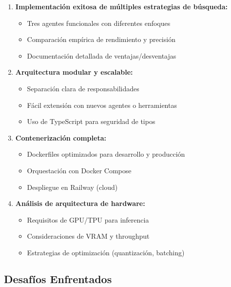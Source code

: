 \documentclass[12pt,a4paper]{article}
\begin{document}
\begin{enumerate}
    \item \textbf{Implementación exitosa de múltiples estrategias de búsqueda:}
    \begin{itemize}
        \item Tres agentes funcionales con diferentes enfoques
        \item Comparación empírica de rendimiento y precisión
        \item Documentación detallada de ventajas/desventajas
    \end{itemize}

    \item \textbf{Arquitectura modular y escalable:}
    \begin{itemize}
        \item Separación clara de responsabilidades
        \item Fácil extensión con nuevos agentes o herramientas
        \item Uso de TypeScript para seguridad de tipos
    \end{itemize}

    \item \textbf{Contenerización completa:}
    \begin{itemize}
        \item Dockerfiles optimizados para desarrollo y producción
        \item Orquestación con Docker Compose
        \item Despliegue en Railway (cloud)
    \end{itemize}

    \item \textbf{Análisis de arquitectura de hardware:}
    \begin{itemize}
        \item Requisitos de GPU/TPU para inferencia
        \item Consideraciones de VRAM y throughput
        \item Estrategias de optimización (quantización, batching)
    \end{itemize}
\end{enumerate}

\subsection{Desafíos Enfrentados}
\end{document}
